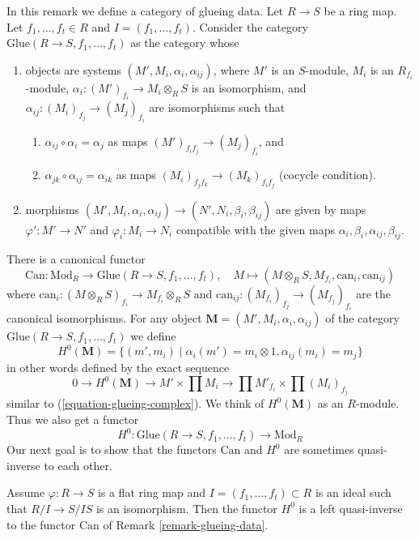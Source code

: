 \begin{remark}
\label{remark-glueing-data}
In this remark we define a category of glueing data.
Let $R \to S$ be a ring map.
Let $f_1, \ldots, f_t \in R$ and $I = (f_1, \ldots, f_t)$.
Consider the category $\text{Glue}(R \to S, f_1, \ldots, f_t)$
as the category whose
\begin{enumerate}
\item objects are systems $(M', M_i, \alpha_i, \alpha_{ij})$, where
$M'$ is an $S$-module, $M_i$ is an $R_{f_i}$-module,
$\alpha_i : (M')_{f_i} \to M_i \otimes_R S$ is an isomorphism, and
$\alpha_{ij} : (M_i)_{f_j} \to (M_j)_{f_i}$ are isomorphisms
such that
\begin{enumerate}
\item $\alpha_{ij} \circ \alpha_i = \alpha_j$ as maps
$(M')_{f_if_j} \to (M_j)_{f_i}$, and
\item $\alpha_{jk} \circ \alpha_{ij} = \alpha_{ik}$ as maps
$(M_i)_{f_jf_k} \to (M_k)_{f_if_j}$ (cocycle condition).
\end{enumerate}
\item morphisms
$(M', M_i, \alpha_i, \alpha_{ij}) \to (N', N_i, \beta_i, \beta_{ij})$
are given by maps $\varphi' : M' \to N'$ and $\varphi_i : M_i \to N_i$
compatible with the given maps $\alpha_i, \beta_i, \alpha_{ij}, \beta_{ij}$.
\end{enumerate}
There is a canonical functor
$$
\text{Can} : \text{Mod}_R
\longrightarrow
\text{Glue}(R \to S, f_1, \ldots, f_t),
\quad
M \longmapsto (M \otimes_R S, M_{f_i}, \text{can}_i, \text{can}_{ij})
$$
where $\text{can}_i : (M \otimes_R S)_{f_i} \to M_{f_i} \otimes_R S$
and $\text{can}_{ij} : (M_{f_i})_{f_j} \to (M_{f_j})_{f_i}$
are the canonical isomorphisms. For any object
$\mathbf{M} = (M', M_i, \alpha_i, \alpha_{ij})$ of the category
$\text{Glue}(R \to S, f_1, \ldots, f_t)$ we define
$$
H^0(\mathbf{M}) =
\{(m', m_i) \mid \alpha_i(m') = m_i \otimes 1, \alpha_{ij}(m_i) = m_j\}
$$
in other words defined by the exact sequence
$$
0 \to H^0(\mathbf{M}) \to
M' \times \prod M_i \to
\prod M'_{f_i}
\times
\prod (M_i)_{f_j}
$$
similar to (\ref{equation-glueing-complex}).
We think of $H^0(\mathbf{M})$ as an $R$-module. Thus we also get a functor
$$
H^0 : 
\text{Glue}(R \to S, f_1, \ldots, f_t)
\longrightarrow
\text{Mod}_R
$$
Our next goal is to show that the functors
$\text{Can}$ and $H^0$ are sometimes quasi-inverse to each other.
\end{remark}

\begin{lemma}
\label{lemma-H0-inverse}
Assume $\varphi : R \to S$ is a flat ring map and
$I = (f_1, \ldots, f_t) \subset R$ is an ideal such that
$R/I \to S/IS$ is an isomorphism. Then the functor $H^0$
is a left quasi-inverse to the functor $\text{Can}$ of
Remark \ref{remark-glueing-data}.
\end{lemma}

